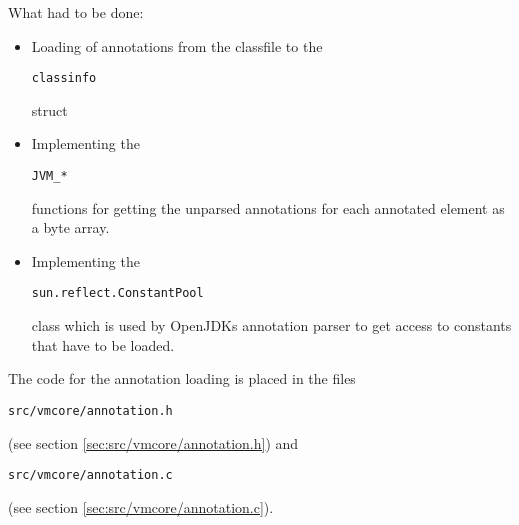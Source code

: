 \documentclass[a4paper, 10pt, titlepage]{scrartcl} %
\begin{document}
What had to be done:
\begin{itemize}
 \item Loading of annotations from the classfile to the \begin{scriptsize}\verb|classinfo|\end{scriptsize} struct
 \item Implementing the \begin{scriptsize}\verb|JVM_|\hspace{0.0pt}\verb|*|\hspace{0.0pt}\verb||\end{scriptsize} functions for getting the unparsed annotations for each annotated element as a byte array.
 \item Implementing the \begin{scriptsize}\verb|sun|\hspace{0.0pt}\verb|.|\hspace{0.0pt}\verb|reflect|\hspace{0.0pt}\verb|.|\hspace{0.0pt}\verb|ConstantPool|\end{scriptsize} class which is used by OpenJDKs annotation parser to get access to constants that have to be loaded.
\end{itemize}

The code for the annotation loading is placed in the files
\begin{scriptsize}\verb|src|\hspace{0.0pt}\verb|/|\hspace{0.0pt}\verb|vmcore|\hspace{0.0pt}\verb|/|\hspace{0.0pt}\verb|annotation|\hspace{0.0pt}\verb|.|\hspace{0.0pt}\verb|h|\end{scriptsize} (see section \ref{sec:src/vmcore/annotation.h}) and
\begin{scriptsize}\verb|src|\hspace{0.0pt}\verb|/|\hspace{0.0pt}\verb|vmcore|\hspace{0.0pt}\verb|/|\hspace{0.0pt}\verb|annotation|\hspace{0.0pt}\verb|.|\hspace{0.0pt}\verb|c|\end{scriptsize} (see section \ref{sec:src/vmcore/annotation.c}).
\end{document}
